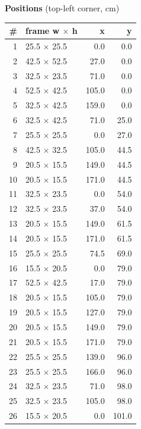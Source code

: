 \documentclass[a4paper,landscape,10pt]{article}
\begin{document}
\begin{minipage}[t]{0.25\textwidth}
\vspace{8pt}
{\bfseries Positions} (top-left corner, cm)\\[2pt]
\tiny
\begin{tabular}{@{}r l r r@{}}
\toprule
\# & frame w $\times$ h & x & y \\
\midrule
1 & 25.5 $\times$ 25.5 & 0.0 & 0.0 \\
2 & 42.5 $\times$ 52.5 & 27.0 & 0.0 \\
3 & 32.5 $\times$ 23.5 & 71.0 & 0.0 \\
4 & 52.5 $\times$ 42.5 & 105.0 & 0.0 \\
5 & 32.5 $\times$ 42.5 & 159.0 & 0.0 \\
6 & 32.5 $\times$ 42.5 & 71.0 & 25.0 \\
7 & 25.5 $\times$ 25.5 & 0.0 & 27.0 \\
8 & 42.5 $\times$ 32.5 & 105.0 & 44.5 \\
9 & 20.5 $\times$ 15.5 & 149.0 & 44.5 \\
10 & 20.5 $\times$ 15.5 & 171.0 & 44.5 \\
11 & 32.5 $\times$ 23.5 & 0.0 & 54.0 \\
12 & 32.5 $\times$ 23.5 & 37.0 & 54.0 \\
13 & 20.5 $\times$ 15.5 & 149.0 & 61.5 \\
14 & 20.5 $\times$ 15.5 & 171.0 & 61.5 \\
15 & 25.5 $\times$ 25.5 & 74.5 & 69.0 \\
16 & 15.5 $\times$ 20.5 & 0.0 & 79.0 \\
17 & 52.5 $\times$ 42.5 & 17.0 & 79.0 \\
18 & 20.5 $\times$ 15.5 & 105.0 & 79.0 \\
19 & 20.5 $\times$ 15.5 & 127.0 & 79.0 \\
20 & 20.5 $\times$ 15.5 & 149.0 & 79.0 \\
21 & 20.5 $\times$ 15.5 & 171.0 & 79.0 \\
22 & 25.5 $\times$ 25.5 & 139.0 & 96.0 \\
23 & 25.5 $\times$ 25.5 & 166.0 & 96.0 \\
24 & 32.5 $\times$ 23.5 & 71.0 & 98.0 \\
25 & 32.5 $\times$ 23.5 & 105.0 & 98.0 \\
26 & 15.5 $\times$ 20.5 & 0.0 & 101.0 \\
\bottomrule
\end{tabular}
\end{minipage}
\clearpage
\end{document}
